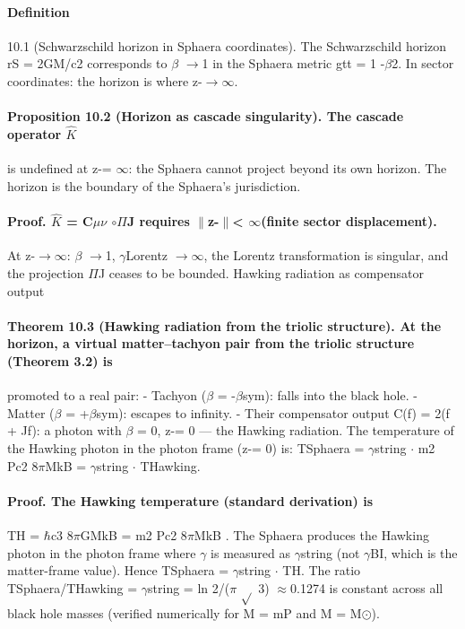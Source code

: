 \documentclass[12pt,a4paper]{article}
\begin{document}
\paragraph*{Definition}
10.1
(Schwarzschild horizon in Sphaera coordinates). The Schwarzschild horizon rS = 2GM/c2 corresponds to $\beta$ $\to$1 in the Sphaera metric gtt = 1 -$\beta$2. In sector coordinates: the horizon is where z-$\to$$\infty$.
\paragraph*{Proposition 10.2 (Horizon as cascade singularity). The cascade operator $\hat K$}
is undefined at z-= $\infty$: the Sphaera cannot project beyond its own horizon. The horizon is the boundary of the Sphaera's jurisdiction.
\paragraph*{Proof. $\hat K$ = C$\mu$$\nu$ $\circ$$\Pi$J requires $\|$z-$\|$< $\infty$(finite sector displacement).}
At z-$\to$$\infty$: $\beta$ $\to$1, $\gamma$Lorentz $\to$$\infty$, the Lorentz transformation is singular, and the projection $\Pi$J ceases to be bounded. Hawking radiation as compensator output
\paragraph*{Theorem 10.3 (Hawking radiation from the triolic structure). At the horizon, a virtual matter--tachyon pair from the triolic structure (Theorem 3.2) is}
promoted to a real pair:
- Tachyon ($\beta$ = -$\beta$sym): falls into the black hole.
- Matter ($\beta$ = +$\beta$sym): escapes to infinity.
- Their compensator output C(f) =
2(f + Jf): a photon with $\beta$ = 0, z-= 0 --- the Hawking radiation. The temperature of the Hawking photon in the photon frame (z-= 0) is: TSphaera = $\gamma$string $\cdot$ m2 Pc2 8$\pi$MkB = $\gamma$string $\cdot$ THawking.
\paragraph*{Proof. The Hawking temperature (standard derivation) is}
TH = $\hbar$c3 8$\pi$GMkB = m2 Pc2 8$\pi$MkB . The Sphaera produces the Hawking photon in the photon frame where $\gamma$ is measured as $\gamma$string (not $\gamma$BI, which is the matter-frame value). Hence TSphaera = $\gamma$string $\cdot$ TH. The ratio TSphaera/THawking = $\gamma$string = ln 2/($\pi$ $\sqrt{}$ 3) $\approx$0.1274 is constant across all black hole masses (verified numerically for M = mP and M = M$\odot$).
\end{document}
